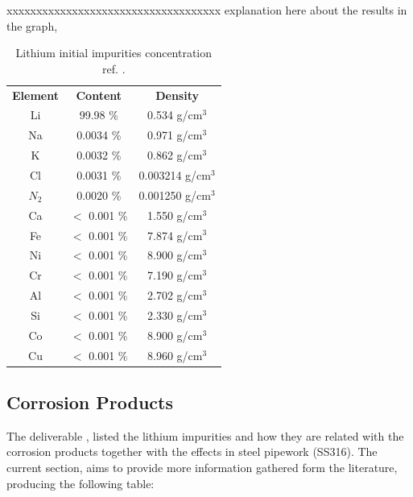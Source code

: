 xxxxxxxxxxxxxxxxxxxxxxxxxxxxxxxxxxxx  explanation here about the results in the graph, 




\begin{table}[H]
	\centering
	\begin{tabular}{ccc}
		\rule[-0.3cm]{0pt}{0.8cm}\textbf{Element}   & \textbf{Content} & \textbf{Density} \\ \Xhline{1.3pt}
		\rule[-0.3cm]{0pt}{0.8cm} Li & 99.98 \% & 0.534 g/cm$^3$ \\ \hline
		\rule[-0.3cm]{0pt}{0.8cm} Na & 0.0034 \% & 0.971 g/cm$^3$ \\ \hline
		\rule[-0.3cm]{0pt}{0.8cm} K & 0.0032 \%  & 0.862 g/cm$^3$ \\ \hline
		\rule[-0.3cm]{0pt}{0.8cm} Cl & 0.0031 \% & 0.003214 g/cm$^3$  \\ \hline
		\rule[-0.3cm]{0pt}{0.8cm} $N_2$ & 0.0020 \% & 0.001250 g/cm$^3$ \\ \hline
		\rule[-0.3cm]{0pt}{0.8cm} Ca & $<$ 0.001 \%  & 1.550 g/cm$^3$ \\ \hline
		\rule[-0.3cm]{0pt}{0.8cm} Fe & $<$ 0.001 \%  & 7.874 g/cm$^3$ \\ \hline
		\rule[-0.3cm]{0pt}{0.8cm} Ni & $<$ 0.001 \%  & 8.900 g/cm$^3$ \\ \hline
		\rule[-0.3cm]{0pt}{0.8cm} Cr & $<$ 0.001 \%  & 7.190 g/cm$^3$ \\ \hline
		\rule[-0.3cm]{0pt}{0.8cm} Al & $<$ 0.001 \%  & 2.702 g/cm$^3$ \\ \hline
		\rule[-0.3cm]{0pt}{0.8cm} Si & $<$ 0.001 \%  & 2.330 g/cm$^3$  \\ \hline
		\rule[-0.3cm]{0pt}{0.8cm} Co & $<$ 0.001 \%  & 8.900 g/cm$^3$ \\ \hline
		\rule[-0.3cm]{0pt}{0.8cm} Cu & $<$ 0.001 \% &  8.960 g/cm$^3$ \\ \hline
	\end{tabular}
	\captionsetup{font=bf, size=small}
	\caption{Lithium initial impurities concentration ref. \cite{Ott1970}.}
	\label{li_imp}
\end{table}








\newpage
\subsection{Corrosion Products}\label{sec:corrosion}
The deliverable \cite{SoA}, listed the lithium impurities and how they are related with the corrosion products together with the effects in steel pipework (SS316). The current section, aims to provide more information gathered form the literature, producing the following table:

